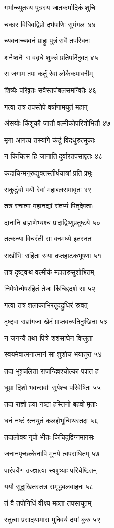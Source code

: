 गर्भाच्च्युतस्य पुत्रस्य जातकर्मादिकं शुचिः

चकार विधिवद्विप्रो दर्भपाणिः सुमंगलः ४४

च्यवनाच्च्यवनं प्राहुः पुत्रं सर्वे तपस्विनः

शनैःशनैः स ववृधे शुक्ले प्रतिपदिंदुवत् ४५

स जगाम तपः कर्तुं रेवां लोकैकपावनीम्

शिष्यैः परिवृतः सर्वैस्तपोबलसमन्वितैः ४६

गत्वा तत्र तपस्तेपे वर्षाणामयुतं महान्

अंसयोः किंशुकौ जातौ वल्मीकोपरिशोभितौ ४७

मृगा आगत्य तस्यांगे कंडूं विदधुरुत्सुकाः

न किंचित्स हि जानाति दुर्वारतपसावृतः ४८

कदाचिन्मनुरुद्युक्तस्तीर्थयात्रां प्रति प्रभुः

सकुटुंबो ययौ रेवां महाबलसमावृतः ४९

तत्र स्नात्वा महानद्यां संतर्प्य पितृदेवताः

दानानि ब्राह्मणेभ्यश्च प्रादाद्विष्णुप्रतुष्टये ५०

तत्कन्या विचरंती सा वनमध्ये इतस्ततः

सखीभिः सहिता रम्या तप्तहाटकभूषणा ५१

तत्र दृष्ट्वाथ वल्मीकं महातरुसुशोभितम्

निमेषोन्मेषरहितं तेजः किंचिद्ददर्श सा ५२

गत्वा तत्र शलाकाभिरतुदद्रुधिरं स्रवत्

दृष्ट्वा राज्ञांगजा खेदं प्राप्तवत्यतिदुःखिता ५३

न जनन्यै तथा पित्रे शशंसाघेन विप्लुता

स्वयमेवात्मनात्मानं सा शुशोच भयातुरा ५४

तदा भूश्चलिता राजन्दिवश्चोल्का पपात ह

धूम्रा दिशो भवन्सर्वाः सूर्यश्च परिवेषितः ५५

तदा राज्ञो हया नष्टा हस्तिनो बहवो मृताः

धनं नष्टं रत्नयुतं कलहोभून्मिथस्तदा ५६

तदालोक्य नृपो भीतः किंचिदुद्विग्नमानसः

जनानपृच्छत्केनापि मुनये त्वपराधितम् ५७

पारंपर्येण तज्ज्ञात्वा स्वपुत्र्याः परिचेष्टितम्

ययौ सुदुःखितस्तत्र समृद्धबलवाहनः ५८

तं वै तपोनिधिं वीक्ष्य महता तपसायुतम्

स्तुत्वा प्रसादयामास मुनिवर्य दयां कुरु ५९

